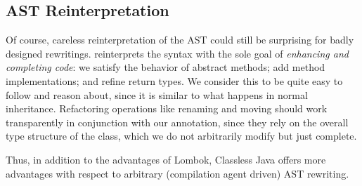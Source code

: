 \subsection{\mixin AST Reinterpretation}

Of course, careless reinterpretation of the AST could still be
surprising for badly designed rewritings.  \mixin reinterprets
the syntax with the sole goal of \emph{enhancing and completing code}:
we satisfy the behavior of abstract methods; add method
implementations; and refine return types.  We consider this to be
quite easy to follow and reason about, since it is similar to what
happens in normal inheritance.  Refactoring operations like renaming
and moving should work transparently in conjunction with our
annotation, since they rely on the overall type structure of the
class, which we do not arbitrarily modify but just complete.

Thus, in addition to the advantages of Lombok, Classless Java offers
 more advantages with respect to arbitrary (compilation agent driven) AST rewriting.




